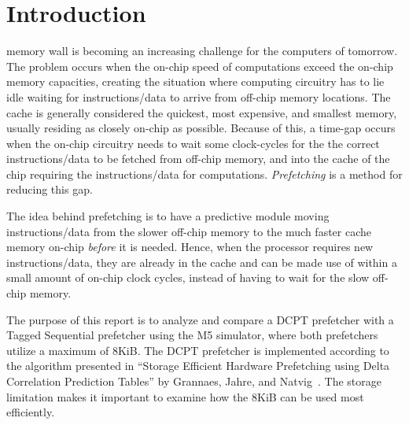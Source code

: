 \section{Introduction}

 memory wall is becoming an increasing challenge for the
computers of tomorrow. The problem occurs when the on-chip speed of computations
exceed the on-chip memory capacities, creating the situation where computing
circuitry has to lie idle waiting for instructions/data to arrive from off-chip
memory locations. The cache is generally considered the quickest, most
expensive, and smallest memory, usually residing as closely on-chip as possible.
Because of this, a time-gap occurs when the on-chip circuitry needs to wait some
clock-cycles for the the correct instructions/data to be fetched from off-chip
memory, and into the cache of the chip requiring the instructions/data for
computations. \emph{Prefetching} is a method for reducing this gap.

The idea behind prefetching is to have a predictive module moving
instructions/data from the slower off-chip memory to the much faster cache
memory on-chip \emph{before} it is needed. Hence, when the processor requires
new instructions/data, they are already in the cache and can be made use of
within a small amount of on-chip clock cycles, instead of having to wait for the
slow off-chip memory.

The purpose of this report is to analyze and compare a DCPT prefetcher with a
Tagged Sequential prefetcher using the M5 simulator, where both prefetchers
utilize a maximum of 8KiB. The DCPT prefetcher is implemented according to the
algorithm presented in ``Storage Efficient Hardware Prefetching using Delta
Correlation Prediction Tables'' by Grannaes, Jahre, and Natvig~\cite{dcpt}. The
storage limitation makes it important to examine how the 8KiB can be used most
efficiently.


